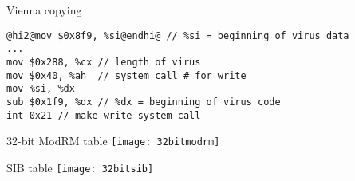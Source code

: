 \begin{frame}[fragile,label=virusWriting]{Vienna copying}
\begin{lstlisting}
@hi2@mov $0x8f9, %si@endhi@ // %si = beginning of virus data
...
mov $0x288, %cx // length of virus
mov $0x40, %ah  // system call # for write
mov %si, %dx
sub $0x1f9, %dx // %dx = beginning of virus code
int 0x21 // make write system call
\end{lstlisting}
\end{frame}

\begin{frame}{32-bit ModRM table}
\texttt{[image: 32bitmodrm]}
\end{frame}

\begin{frame}{SIB table}
\texttt{[image: 32bitsib]}
\end{frame}
